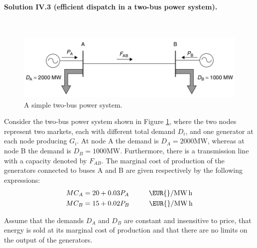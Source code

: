 \documentclass[11pt,a4paper,fleqn]{scrartcl}
\newcommand{\eur}{\text{\EUR{}}}
\begin{document}
\paragraph{Solution IV.3 \normalsize (efficient dispatch in a two-bus power system).}~\\

\begin{figure}[h]
 \centering
 \includegraphics[width=14cm]{two-bus}
 \caption{A simple two-bus power system.}
 \label{twobus}
\end{figure}

Consider the two-bus power system shown in Figure \ref{twobus}, where the two nodes represent two markets, each with different total demand $D_i$, and one generator at each node producing $G_i$. At node A the demand is $D_A = 2000 \si{\mega\watt}$, whereas at node B the demand is $D_B = 1000 \si{\mega\watt}$. Furthermore, there is a transmission line with a capacity denoted by $F_{AB}$. The marginal cost of production of the generators connected to buses A and B are given respectively by the following expressions:
\begin{align*}
 MC_A & = 20 + 0.03 P_A \hspace{1cm}\eur/\si{\mega\watt\hour}  \\
 MC_B & = 15 + 0.02 P_B \hspace{1cm} \eur/\si{\mega\watt\hour}
\end{align*}

Assume that the demands $D_A$ and $D_B$ are constant and insensitive to price, that energy is sold at its marginal cost of production and that there are no limits on the output of the generators.
\end{document}
